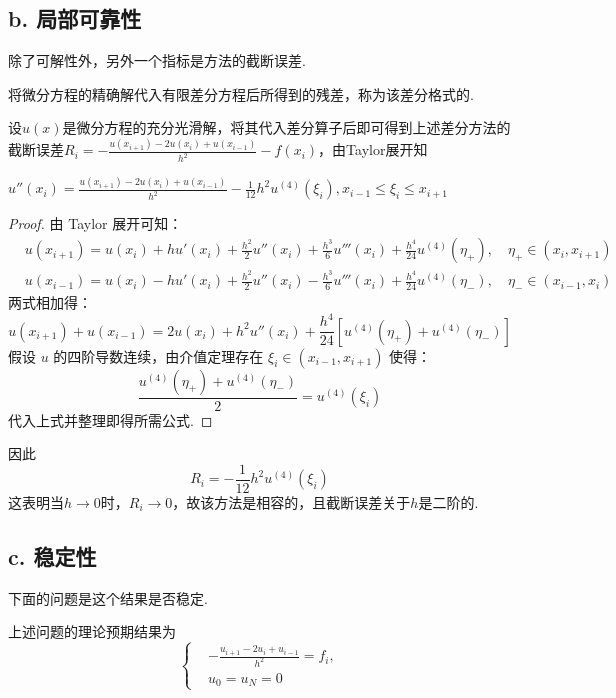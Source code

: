 \subsection*{b. 局部可靠性}
除了可解性外，另外一个指标是方法的截断误差.\par
\begin{definition}[截断误差]
    将微分方程的精确解代入有限差分方程后所得到的残差，称为该差分格式的.
\end{definition}
设$u(x)$是微分方程的充分光滑解，将其代入差分算子后即可得到上述差分方法的截断误差$R_i=-\frac{u(x_{i+1})-2u(x_i)+u(x_{i-1})}{h^2}-f(x_i)$，由Taylor展开知
\begin{proposition}[二阶导数的二阶中心差商逼近公式]
    $u''(x_i)=\frac{u(x_{i+1})-2u(x_i)+u(x_{i-1})}{h^2}-\frac{1}{12}h^2u^{(4)}(\xi_i),x_{i-1}\leq \xi_i\leq x_{i+1}$
\end{proposition}
\begin{proof}
    由 Taylor 展开可知：
    \begin{align*}
        &u(x_{i+1}) = u(x_i) + h u'(x_i) + \frac{h^2}{2} u''(x_i) + \frac{h^3}{6} u'''(x_i) + \frac{h^4}{24} u^{(4)}(\eta_+), \quad \eta_+ \in (x_i, x_{i+1}) \\
        &u(x_{i-1}) = u(x_i) - h u'(x_i) + \frac{h^2}{2} u''(x_i) - \frac{h^3}{6} u'''(x_i) + \frac{h^4}{24} u^{(4)}(\eta_-), \quad \eta_- \in (x_{i-1}, x_i)
    \end{align*}
    两式相加得：
    \[ u(x_{i+1}) + u(x_{i-1}) = 2u(x_i) + h^2 u''(x_i) + \frac{h^4}{24} [u^{(4)}(\eta_+) + u^{(4)}(\eta_-)] \]
    假设 $u$ 的四阶导数连续，由介值定理存在 $\xi_i \in (x_{i-1}, x_{i+1})$ 使得：
    \[ \frac{u^{(4)}(\eta_+) + u^{(4)}(\eta_-)}{2} = u^{(4)}(\xi_i) \]
    代入上式并整理即得所需公式.
\end{proof}
因此
\begin{equation}
R_i=-\frac{1}{12}h^2u^{(4)}(\xi_i)
\end{equation}
这表明当$h\to 0$时，$R_i\to 0$，故该方法是相容的，且截断误差关于$h$是二阶的.\par
\subsection*{c. 稳定性} 
下面的问题是这个结果是否稳定.\par
上述问题的理论预期结果为
\begin{equation}
    \left\{\begin{aligned}
        &-\frac{u_{i+1}-2u_i+u_{i-1}}{h^2}=f_i ,\\
        &u_0=u_N=0 
    \end{aligned}\right.
\end{equation}

